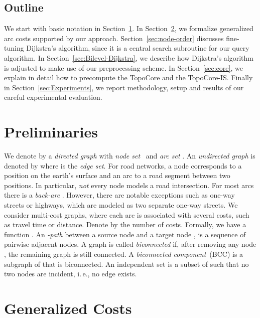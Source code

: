 \documentclass{sig-alternate}
\newcommand{\ie}{i.\,e.\xspace}
\begin{document}
\subsection{Outline}

We start with basic notation in Section~\ref{sec:prelim}.
In Section~\ref{sec:costs}, we formalize generalized arc costs supported by our approach.
Section~\ref{sec:node-order} discusses fine-tuning
Dijkstra's algorithm, since it is a central search subroutine for our query algorithm. 
In Section~\ref{sec:Bilevel-Dijkstra}, we describe how Dijkstra's algorithm is adjusted to make use of our preprocessing scheme. In Section~\ref{sec:core}, we explain in detail how to precompute the TopoCore and the TopoCore-IS. 
Finally in Section~\ref{sec:Experiments}, we report
methodology, setup and results of our careful experimental evaluation.

\section{Preliminaries}\label{sec:prelim}

We denote by  a \emph{directed graph} with \emph{node set}~ and \emph{arc set} . 
An \emph{undirected graph} is denoted by  where  is the \emph{edge set}.
 For road networks,
a node corresponds to a position on the earth's surface and an arc
to a road segment between two positions. In particular, \emph{not} every node
models a road intersection. For most arcs  there is a \emph{back-arc}
. However, there are notable exceptions such as one-way streets
or highways, which are modeled as two separate one-way streets. 
We consider multi-cost graphs, where each arc is associated with several costs, such as travel time
or distance. Denote by  the number of costs. Formally, we have
a function .
An \emph{-path}  between a source node  and a target node , is a sequence  of pairwise adjacent nodes.
A graph is called \emph{biconnected} if, after removing any node , the remaining graph  is still connected.
A \emph{biconnected component}~(BCC) is a subgraph of  that
is biconnected. An independent set  is a subset of  such that
no two nodes  are incident, \ie, no edge  exists.



\section{Generalized Costs}\label{sec:costs}
\end{document}
